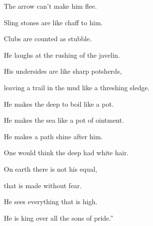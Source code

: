 {\par }{\Q {}The arrow can’t make him flee.
\par }{\QB Sling stones are like chaff to him.
\par }{\Q {}Clubs are counted as stubble.
\par }{\QB He laughs at the rushing of the javelin.
\par }{\Q {}His undersides are like sharp potsherds,
\par }{\QB leaving a trail in the mud like a threshing sledge.
\par }{\Q {}He makes the deep to boil like a pot.
\par }{\QB He makes the sea like a pot of ointment.
\par }{\Q {}He makes a path shine after him.
\par }{\QB One would think the deep had white hair.
\par }{\Q {}On earth there is not his equal,
\par }{\QB that is made without fear.
\par }{\Q {}He sees everything that is high.
\par }{\QB He is king over all the sons of pride.”
\par }{\BB \par }
